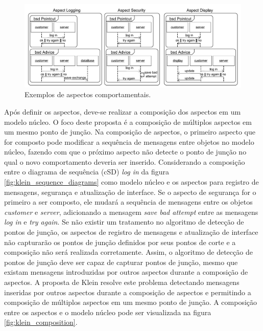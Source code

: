 \begin{figure}
	\centering
	\includegraphics[width=475px]{img/klein_aspects.png}
	\caption{Exemplos de aspectos comportamentais.}\label{fig:klein_aspects}
\end{figure}

Após definir os aspectos, deve-se realizar a composição dos aspectos em um modelo núcleo. O foco deste proposta é a composição de múltiplos aspectos
em um mesmo ponto de junção. Na composição de aspectos, o primeiro aspecto que for composto pode modificar a sequência de mensagens entre objetos no
modelo núcleo, fazendo com que o próximo aspecto não detecte o ponto de junção no qual o novo comportamento deveria ser inserido. Considerando a
composição entre o diagrama de sequência (cSD) \textit{log in} da figura \ref{fig:klein_sequence_diagrams} como modelo núcleo e os aspectos para
registro de mensagens, segurança e atualização de interface. Se o aspecto de segurança for o primeiro a ser composto, ele mudará a sequência de
mensagens entre os objetos \textit{customer} e \textit{server}, adicionando a mensagem \textit{save bad attempt} entre as mensagens \textit{log in} e
\textit{try again}. Se não existir um tratamento no algoritmo de detecção de pontos de junção,  os aspectos de registro de mensagens e atualização de
interface não capturarão os pontos de junção definidos por seus pontos de corte e a composição não será realizada corretamente. Assim, o algoritmo de
detecção de pontos de junção deve ser capaz de capturar pontos de junção, mesmo que existam mensagens introduzidas por outros aspectos durante a
composição de aspectos. A proposta de Klein resolve este problema detectando mensagens inseridas por outros aspectos durante a composição
de aspectos e permitindo a composição de múltiplos aspectos em um mesmo ponto de junção. A composição entre os aspectos e o modelo núcleo pode ser
visualizada na figura \ref{fig:klein_composition}.

